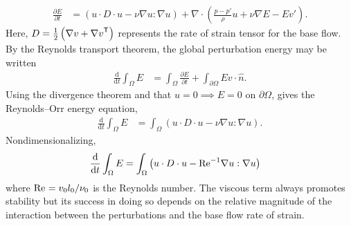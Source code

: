 \begin{align}
  \label{eq:reynoldsorr_pointwise}
  \frac{\partial\!E}{\partial\!t}
&=
    \left(
         u \cdot D \cdot u - \nu \nabla u : \nabla u
    \right)
  + \nabla \cdot \left(
      \frac{p-p'}{\rho} u + \nu\nabla{}E - E v'
    \right).
\end{align}
Here, $D = \frac{1}{2}\left(\nabla v + {\nabla v}^{\mathsf{T}}\right)$ represents the
rate of strain tensor for the base flow.  By the Reynolds transport theorem,
the global perturbation energy may be written
\begin{align}
  \frac{\mathrm{d}}{\mathrm{d}t} \int_\Omega E
&=
  \int_\Omega \frac{\partial\!E}{\partial\!t}
+
  \int_{\partial\!\Omega} E v \cdot \hat{n}.
\end{align}
Using the divergence theorem and that $u = 0 \implies E = 0$ on
$\partial\!\Omega$, gives the Reynolds--Orr energy equation,
\begin{align}
  \frac{\mathrm{d}}{\mathrm{d}t} \int_\Omega E
&=
  \int_\Omega \left( u \cdot D \cdot u - \nu \nabla u : \nabla u \right).
\end{align}
Nondimensionalizing,
\begin{align}
  \label{eq:reynoldsorr}
  \frac{\mathrm{d}}{\mathrm{d}t} \int_\Omega E
&=
  \int_\Omega \left(
        u \cdot D \cdot u
      - \mbox{Re}_{}^{-1} \nabla u : \nabla u
  \right)
\end{align}
where $\mbox{Re}_{} = v_0 l_0 / \nu_0$ is the Reynolds number.  The
viscous term always promotes stability but its success in doing so depends on
the relative magnitude of the interaction between the perturbations and the
base flow rate of strain.

